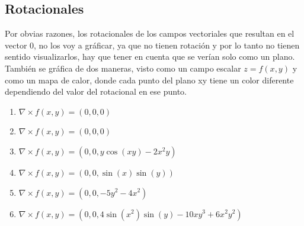 \subsection{Rotacionales}
Por obvias razones, los rotacionales de los campos vectoriales que resultan en el vector 0, no los voy a gráficar,
ya que no tienen rotación y por lo tanto no tienen sentido visualizarlos, hay que tener en cuenta que se verían solo 
como un plano. También se gráfica de dos maneras, visto como un campo escalar $ z = f(x,y) $ y como un mapa de calor, 
donde cada punto del plano xy tiene un color diferente dependiendo del valor del rotacional en ese punto.

\begin{enumerate}
    \item $ \nabla \times f(x,y) = (0,0,0) $
    \item $ \nabla \times f(x,y) = (0,0,0) $
    \item $ \nabla \times f(x,y) = \left(0,0,y\cos(xy) - 2x^2y\right) $
    \item $ \nabla \times f(x,y) = \left(0,0,\sin(x)\sin(y)\right) $
    \item $ \nabla \times f(x,y) = \left(0,0,-5y^2 - 4x^2\right) $
    \item $ \nabla \times f(x,y) = \left(0,0,4\sin(x^2)\sin(y) -10xy^3 +6x^2y^2\right) $
\end{enumerate}


